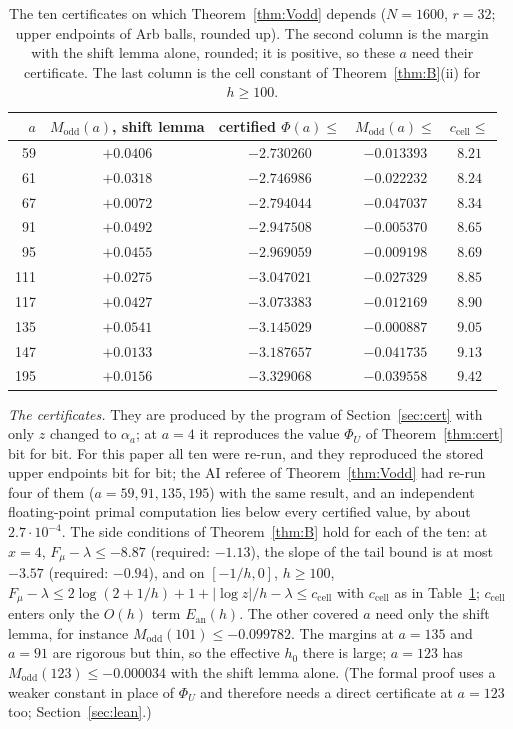 \documentclass[11pt]{amsart}
\theoremstyle{definition}
\theoremstyle{remark}
\numberwithin{equation}{section}
\newcommand{\ccell}{c_{\mathrm{cell}}}
\begin{document}
\begin{table}[ht]
\centering\small
\begin{tabular}{@{}rcccc@{}}
\toprule
$a$ & $M_{\mathrm{odd}}(a)$, shift lemma & certified $\Phi(a)\le$ & $M_{\mathrm{odd}}(a)\le$ & $\ccell\le$\\
\midrule
59 & $+0.0406$ & $-2.730260$ & $-0.013393$ & $8.21$\\
61 & $+0.0318$ & $-2.746986$ & $-0.022232$ & $8.24$\\
67 & $+0.0072$ & $-2.794044$ & $-0.047037$ & $8.34$\\
91 & $+0.0492$ & $-2.947508$ & $-0.005370$ & $8.65$\\
95 & $+0.0455$ & $-2.969059$ & $-0.009198$ & $8.69$\\
111 & $+0.0275$ & $-3.047021$ & $-0.027329$ & $8.85$\\
117 & $+0.0427$ & $-3.073383$ & $-0.012169$ & $8.90$\\
135 & $+0.0541$ & $-3.145029$ & $-0.000887$ & $9.05$\\
147 & $+0.0133$ & $-3.187657$ & $-0.041735$ & $9.13$\\
195 & $+0.0156$ & $-3.329068$ & $-0.039558$ & $9.42$\\
\bottomrule
\end{tabular}
\caption{The ten certificates on which Theorem~\ref{thm:Vodd} depends ($N=1600$, $r=32$; upper endpoints of Arb
balls, rounded up). The second column is the margin with the shift lemma alone, rounded; it is positive, so these $a$
need their certificate. The last column is the cell constant of Theorem~\ref{thm:B}(ii) for $h\ge100$.}\label{tab:certodd}
\end{table}

\emph{The certificates.} They are produced by the program of Section~\ref{sec:cert} with only $z$ changed to $\alpha_a$;
at $a=4$ it reproduces the value $\Phi_U$ of Theorem~\ref{thm:cert} bit for bit. For this paper all ten were re-run, and
they reproduced the stored upper endpoints bit for bit; the AI referee of Theorem~\ref{thm:Vodd} had re-run four of them
($a=59,91,135,195$) with the same result, and an independent floating-point primal computation lies below every
certified value, by about $2.7\cdot10^{-4}$. The side conditions of Theorem~\ref{thm:B} hold for each of the ten: at
$x=4$, $F_\mu-\lambda\le-8.87$ (required: $-1.13$), the slope of the tail bound is at most $-3.57$ (required: $-0.94$),
and on $[-1/h,0]$, $h\ge100$, $F_\mu-\lambda\le2\log(2+1/h)+1+|\log z|/h-\lambda\le\ccell$ with $\ccell$ as in
Table~\ref{tab:certodd}; $\ccell$ enters only the $O(h)$ term $E_{\mathrm{an}}(h)$. The other covered $a$ need only
the shift lemma, for instance $M_{\mathrm{odd}}(101)\le-0.099782$. The margins at $a=135$ and $a=91$ are rigorous but thin,
so the effective $h_0$ there is large; $a=123$ has $M_{\mathrm{odd}}(123)\le-0.000034$ with the shift lemma alone. (The
formal proof uses a weaker constant in place of $\Phi_U$ and therefore needs a direct certificate at $a=123$ too;
Section~\ref{sec:lean}.)
\end{document}
